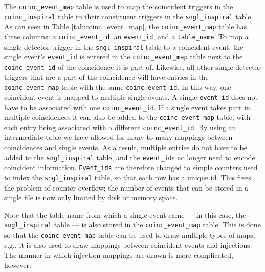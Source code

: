 The \texttt{coinc\_event\_map} table is used to map the coincident triggers in
the \texttt{coinc\_inspiral} table to their constituent triggers in the
\texttt{sngl\_inspiral} table. As can seen in Table \ref{tab:coinc_event_map},
the \texttt{coinc\_event\_map} table has three columns: a
\texttt{coinc\_event\_id}, an \texttt{event\_id}, and a \texttt{table\_name}.
To map a single-detector trigger in the \texttt{sngl\_inspiral} table to a
coincident event, the single event's \texttt{event\_id} is entered in the
\texttt{coinc\_event\_map} table next to the \texttt{coinc\_event\_id} of the
coincidence it is part of. Likewise, all other single-detector triggers that
are a part of the coincidence will have entries in the
\texttt{coinc\_event\_map} table with the same \texttt{coinc\_event\_id}. In
this way, one coincident event is mapped to multiple single events. A single
\texttt{event\_id} does not have to be associated with one
\texttt{coinc\_event\_id}. If a single event takes part in multiple
coincidences it can also be added to the \texttt{coinc\_event\_map} table, with
each entry being associated with a different \texttt{coinc\_event\_id}. By
using an intermediate table we have allowed for many-to-many mappings between
coincidences and single events. As a result, multiple entries do not have to be
added to the \texttt{sngl\_inspiral} table, and the \texttt{event\_id}s no
longer need to encode coincident information. \texttt{Event\_ids} are therefore
changed to simple counters used to index the \texttt{sngl\_inspiral} table, so
that each row has a unique id. This fixes the problem of counter-overflow; the
number of events that can be stored in a single file is now only limited by
disk or memory space.

Note that the table name from which a single event came --- in this case, the
\texttt{sngl\_inspiral} table --- is also stored in the
\texttt{coinc\_event\_map} table. This is done so that the
\texttt{coinc\_event\_map} table can be used to draw multiple types of maps,
e.g., it is also used to draw mappings between coincident events and
injections. The manner in which injection mappings are drawn is more
complicated, however.

